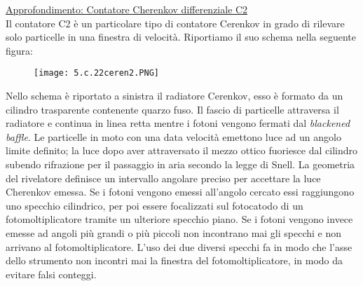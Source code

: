 \documentclass[twoside]{article}
\begin{document}
\underline{Approfondimento: Contatore Cherenkov differenziale C2}\\
Il contatore C2 è un particolare tipo di contatore Cerenkov in grado di rilevare solo particelle in una finestra di velocità. Riportiamo il suo schema nella seguente figura:
\begin{figure}[H]
    \centering
    \texttt{[image: 5.c.22ceren2.PNG]}
    \label{fig:5.c.22ceren2}
\end{figure}
Nello schema è riportato a sinistra il radiatore Cerenkov, esso è formato da un cilindro trasparente contenente quarzo fuso. Il fascio di particelle attraversa il radiatore e continua in linea retta mentre i fotoni vengono fermati dal \textit{blackened baffle}.
Le particelle in moto con una data velocità emettono luce ad un angolo limite definito; la luce dopo aver attraversato il mezzo ottico fuoriesce dal cilindro subendo rifrazione per il passaggio in aria secondo la legge di Snell.
La geometria del rivelatore  definisce un intervallo angolare preciso per accettare la luce Cherenkov emessa.
Se i fotoni vengono emessi all'angolo cercato essi raggiungono uno specchio cilindrico, per poi essere focalizzati sul fotocatodo di un fotomoltiplicatore tramite un ulteriore specchio piano. Se i fotoni vengono invece emesse ad angoli più grandi o più piccoli non incontrano mai gli specchi e non arrivano al fotomoltiplicatore.
L’uso dei due diversi specchi fa in modo che l’asse dello strumento non incontri mai la finestra del fotomoltiplicatore, in modo da evitare falsi conteggi.
\end{document}
